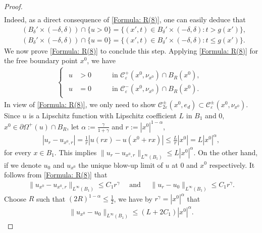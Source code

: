 \documentclass[11pt,reqno]{amsart}
\begin{document}
\begin{proof}
\begin{align}
	\end{align}
	Indeed, as a direct consequence of \eqref{Formula: R(8)}, one can easily deduce that
	\begin{align*}
		&(B_{\delta}'\times(-\delta,\delta))\cap\{u>0\}=\{(x',t)\in B_{\delta}'\times(-\delta,\delta)\colon t>g(x')\},\\
		&(B_{\delta}'\times(-\delta,\delta))\cap\{u=0\}=\{(x',t)\in B_{\delta}'\times(-\delta,\delta)\colon t\leqslant g(x')\}.
	\end{align*}
	We now prove \eqref{Formula: R(8)} to conclude this step. Applying \eqref{Formula: R(8)} for the free boundary point $x^{0}$, we have
	\begin{align*}
		\begin{cases}
			\begin{alignedat}{2}
				u&>0\quad&&\text{ in }\mathcal{C}_{\varepsilon}^{+}(x^{0},\nu_{x^{0}})\cap B_{R}(x^{0}),\\
				u&=0\quad&&\text{ in }\mathcal{C}_{\varepsilon}^{-}(x^{0},\nu_{x^{0}})\cap B_{R}(x^{0}).
			\end{alignedat}
		\end{cases}
	\end{align*}
	In view of \eqref{Formula: R(8)}, we only need to show $\mathcal{C}_{2\varepsilon}^{\pm}(x^{0},e_{d})\subset\mathcal{C}_{\varepsilon}^{\pm}(x^{0},\nu_{x^{0}})$. Since $u$ is a Lipschitz function with Lipschitz coefficient $L$ in $B_{1}$ and $0$, $x^{0}\in\partial\varOmega^{+}(u)\cap B_{R}$, let $\alpha:=\frac{\gamma}{1+\gamma}$ and $r:=|x^{0}|^{1-\alpha}$,
	\begin{align*}
		|u_{r}-u_{x^{0},r}|=\frac{1}{r}|u(rx)-u(x^{0}+rx)|\leqslant\frac{L}{r}|x^{0}|=L|x^{0}|^{\alpha},
	\end{align*}
	for every $x\in B_{1}$. This implies $\|u_{r}-u_{x^{0},r}\|_{L^{\infty}(B_{1})}\leqslant L|x^{0}|^{\alpha}$. On the other hand, if we denote $u_{0}$ and $u_{x^{0}}$ the unique blow-up limit of $u$ at $0$ and $x^{0}$ respectively. It follows from \eqref{Formula: R(8)} that
	\begin{align*}
		\|u_{x^{0}}-u_{x^{0},r}\|_{L^{\infty}(B_{1})}\leqslant C_{1}r^{\gamma}\quad\text{ and }\quad\|u_{r}-u_{0}\|_{L^{\infty}(B_{1})}\leqslant C_{1}r^{\gamma}.
	\end{align*}
	Choose $R$ such that $(2R)^{1-\alpha}\leqslant\tfrac{1}{2}$, we have by $r^{\gamma}=|x^{0}|^{\alpha}$ that
	\begin{align*}
		\|u_{x^{0}}-u_{0}\|_{L^{\infty}(B_{1})}\leqslant(L+2C_{1})|x^{0}|^{\alpha}.
	\end{align*}

\end{proof}
\end{document}
